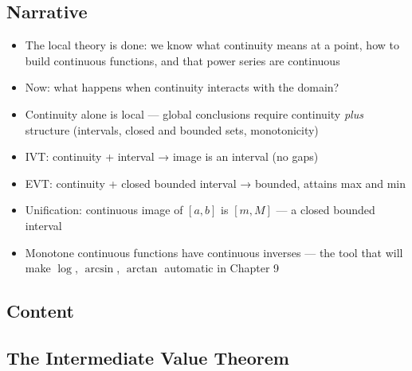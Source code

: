 \documentclass[
  10pt,
  letterpaper,
]{scrbook}
\providecommand{\tightlist}{%
  \setlength{\itemsep}{0pt}\setlength{\parskip}{0pt}}
\begin{document}
\subsection{Narrative}\label{narrative-27}

\begin{itemize}
\tightlist
\item
  The local theory is done: we know what continuity means at a point,
  how to build continuous functions, and that power series are
  continuous
\item
  Now: what happens when continuity interacts with the domain?
\item
  Continuity alone is local --- global conclusions require continuity
  \emph{plus} structure (intervals, closed and bounded sets,
  monotonicity)
\item
  IVT: continuity + interval → image is an interval (no gaps)
\item
  EVT: continuity + closed bounded interval → bounded, attains max and
  min
\item
  Unification: continuous image of \([a,b]\) is \([m, M]\) --- a closed
  bounded interval
\item
  Monotone continuous functions have continuous inverses --- the tool
  that will make \(\log\), \(\arcsin\), \(\arctan\) automatic in Chapter
  9
\end{itemize}

\subsection{Content}\label{content-27}

\subsection{The Intermediate Value
Theorem}\label{the-intermediate-value-theorem}
\end{document}
